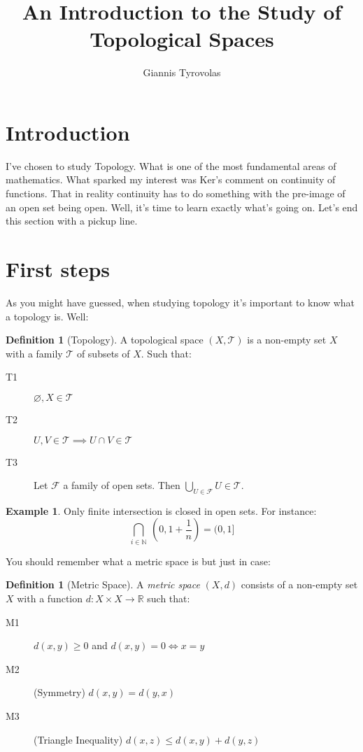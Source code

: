 \documentclass[11pt,a4paper]{article}
\title{An Introduction to the Study of Topological Spaces}
\author{Giannis Tyrovolas}
\theoremstyle{definition}
\newtheorem{definition}[theorem]{Definition}
\newtheorem{example}[theorem]{Example}
\let\emptyset\varnothing
\begin{document}
\maketitle

\section{Introduction}

I've chosen to study Topology. What is one of the most fundamental areas of mathematics. What sparked my interest was Ker's comment on continuity of functions. That in reality continuity has to do something with the pre-image of an open set being open. Well, it's time to learn exactly what's going on. Let's end this section with a pickup line.


\section{First steps}

As you might have guessed, when studying topology it's important to know what a topology is. Well:

\begin{definition}[Topology]

A topological space $(X,\mathcal{T})$ is a non-empty set $X$ with a family $\mathcal{T}$ of subsets of $X$. Such that:

\begin{description}
	\item[T1] $\emptyset, X \in \mathcal{T}$
	\item[T2] $U, V \in \mathcal{T} \implies U \cap V \in \mathcal{T}$
	\item[T3] Let $\mathcal{F}$ a family of open sets. Then $\bigcup\limits_{U \in \mathcal{F}} U \in \mathcal{T}$.
\end{description}
\end{definition}

\begin{example}
Only finite intersection is closed in open sets. For instance: 
\[
	\bigcap\limits_{i \in \mathbb{N}} \ (0, 1 + \frac{1}{n} ) = (0,1]	
\]

\end{example}

You should remember what a metric space is but just in case:

\begin{definition}[Metric Space]
A \emph{metric space} $(X, d)$ consists of a non-empty set $X$ with a function $d: X \times X \longrightarrow \mathbb{R}$ such that:

\begin{description}
	\item[M1] $d(x,y) \geqslant 0$ and $d(x,y) = 0 \iff x = y$
	\item[M2] (Symmetry) $d(x,y) = d(y, x)$
	\item[M3] (Triangle Inequality) $d(x,z) \leqslant d(x,y) + d(y,z)$
\end{description}
\end{definition}
\end{document}
